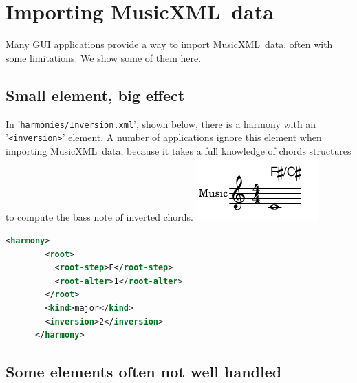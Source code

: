 \documentclass[12pt,a4paper]{article}
\newcommand{\mxml}{MusicXML}
\begin{document}
\section{Importing \mxml\ data}

Many GUI applications provide a way to import \mxml\ data, often with some limitations. We show some of them here.

\subsection{Small element, big effect}

In {'\tt harmonies/Inversion.xml}', shown below, there is a harmony with an {'\tt <inversion>}' element. A number of applications ignore this element when importing \mxml\ data, because it takes a full knowledge of chords structures to compute the bass note of inverted chords.
\includegraphics{Inversion.png}

\begin{lstlisting}[language=XML, caption = Harmony inversion]
      <harmony>
        <root>
          <root-step>F</root-step>
          <root-alter>1</root-alter>
        </root>
        <kind>major</kind>
        <inversion>2</inversion>
      </harmony>
\end{lstlisting}

\subsection{Some elements often not well handled}
\end{document}
